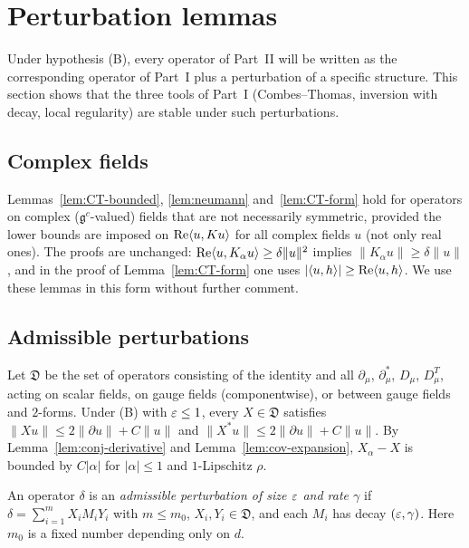\section{Perturbation lemmas}\label{sec:perturbation}

Under hypothesis (B), every operator of Part~II will be written as the corresponding operator of Part~I plus a perturbation of a specific structure. This section shows that the three tools of Part~I (Combes--Thomas, inversion with decay, local regularity) are stable under such perturbations.

\subsection{Complex fields}

Lemmas~\ref{lem:CT-bounded}, \ref{lem:neumann} and~\ref{lem:CT-form} hold for operators on complex ($\mathfrak g^c$-valued) fields that are not necessarily symmetric, provided the lower bounds are imposed on $\operatorname{Re}\langle u,Ku\rangle$ for all complex fields $u$ (not only real ones). The proofs are unchanged: $\operatorname{Re}\langle u,K_\alpha u\rangle\ge\delta\|u\|^2$ implies $\|K_\alpha u\|\ge\delta\|u\|$, and in the proof of Lemma~\ref{lem:CT-form} one uses $|\langle u,h\rangle|\ge\operatorname{Re}\langle u,h\rangle$. We use these lemmas in this form without further comment.

\subsection{Admissible perturbations}

Let $\mathfrak D$ be the set of operators consisting of the identity and all $\partial_\mu$, $\partial^*_\mu$, $D_\mu$, $D^T_\mu$, acting on scalar fields, on gauge fields (componentwise), or between gauge fields and $2$-forms. Under (B) with $\varepsilon\le1$, every $X\in\mathfrak D$ satisfies $\|Xu\|\le2\|\partial u\|+C\|u\|$ and $\|X^*u\|\le2\|\partial u\|+C\|u\|$. By Lemma~\ref{lem:conj-derivative} and Lemma~\ref{lem:cov-expansion}, $X_\alpha-X$ is bounded by $C|\alpha|$ for $|\alpha|\le1$ and $1$-Lipschitz $\rho$.

\begin{definition}\label{def:admissible}
An operator $\delta$ is an \emph{admissible perturbation of size $\varepsilon$ and rate $\gamma$} if $\delta=\sum_{i=1}^mX_iM_iY_i$ with $m\le m_0$, $X_i,Y_i\in\mathfrak D$, and each $M_i$ has decay $(\varepsilon,\gamma)$. Here $m_0$ is a fixed number depending only on $d$.
\end{definition}

